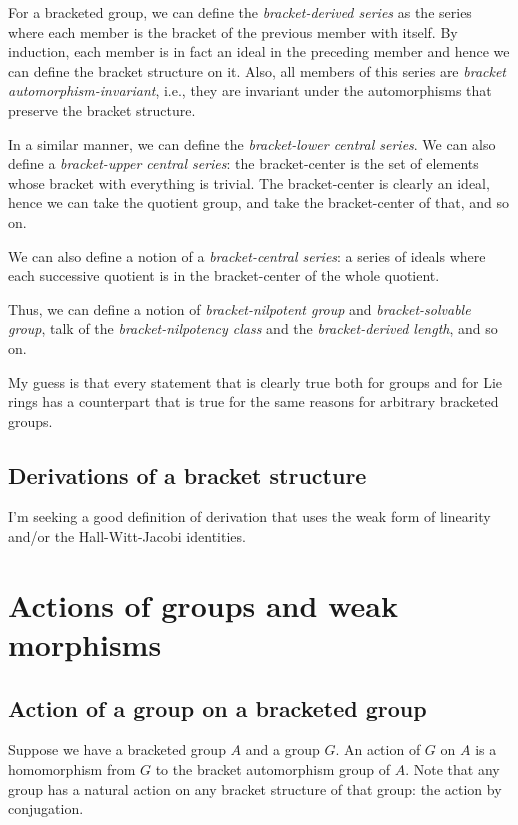 \documentclass[10pt]{amsart}
\begin{document}
For a bracketed group, we can define the {\em bracket-derived series}
as the series where each member is the bracket of the previous member
with itself. By induction, each member is in fact an ideal in the
preceding member and hence we can define the bracket structure on
it. Also, all members of this series are {\em bracket
automorphism-invariant}, i.e., they are invariant under the
automorphisms that preserve the bracket structure.

In a similar manner, we can define the {\em bracket-lower central
series}. We can also define a {\em bracket-upper central series}: the
bracket-center is the set of elements whose bracket with everything is
trivial. The bracket-center is clearly an ideal, hence we can take the
quotient group, and take the bracket-center of that, and so on.

We can also define a notion of a {\em bracket-central series}: a
series of ideals where each successive quotient is in the
bracket-center of the whole quotient.

Thus, we can define a notion of {\em bracket-nilpotent group} and {\em
bracket-solvable group}, talk of the {\em bracket-nilpotency class}
and the {\em bracket-derived length}, and so on.

My guess is that every statement that is clearly true both for groups
and for Lie rings has a counterpart that is true for the same reasons
for arbitrary bracketed groups.

\subsection{Derivations of a bracket structure}

I'm seeking a good definition of derivation that uses the weak form of
linearity and/or the Hall-Witt-Jacobi identities.

\section{Actions of groups and weak morphisms}

\subsection{Action of a group on a bracketed group}
Suppose we have a bracketed group $A$ and a group $G$. An action of
$G$ on $A$ is a homomorphism from $G$ to the bracket automorphism
group of $A$. Note that any group has a natural action on any bracket
structure of that group: the action by conjugation.
\end{document}
